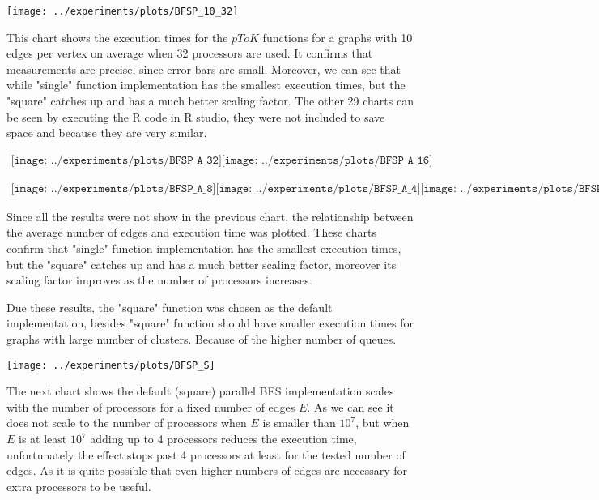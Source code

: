 \documentclass{report}
\theoremstyle{plain}
\theoremstyle{definition}
\theoremstyle{remark}
\begin{document}
\texttt{[image: ../experiments/plots/BFSP\_10\_32]}

This chart shows the execution times for the $pToK$ functions for a graphs with 10 edges per vertex on average when 32 processors are used. It confirms that measurements are precise, since error bars are small. Moreover, we can see that while "single" function implementation has the smallest execution times, but the "square" catches up and has a much better scaling factor. The other 29 charts can be seen by executing the R code in R studio, they were not included to save space and because they are very similar. 

\begin{center}
$
\begin{array}{cc}
\texttt{[image: ../experiments/plots/BFSP\_A\_32]}
\texttt{[image: ../experiments/plots/BFSP\_A\_16]}
\end{array}
$

\center
$
\begin{array}{cc}
\texttt{[image: ../experiments/plots/BFSP\_A\_8]}
\texttt{[image: ../experiments/plots/BFSP\_A\_4]}
\texttt{[image: ../experiments/plots/BFSP\_A\_2]}
\end{array}
$
\end{center}

Since all the results were not show in the previous chart, the relationship between the average number of edges and execution time was plotted. These charts confirm that "single" function implementation has the smallest execution times, but the "square" catches up and has a much better scaling factor, moreover its scaling factor improves as the number of processors increases.

Due these results, the "square" function was chosen as the default implementation, besides "square" function should have smaller execution times for graphs with large number of clusters. Because of the higher number of queues.

\texttt{[image: ../experiments/plots/BFSP\_S]}

The next chart shows the default (square) parallel BFS implementation scales with the number of processors for a fixed number of edges $E$. As we can see it does not  scale to the number of processors when $E$ is smaller than $10^7$, but when $E$ is at least $10^7$ adding up to 4 processors reduces the execution time, unfortunately the effect stops past 4 processors at least for the tested number of edges. As it is quite possible that even higher numbers of edges are necessary for extra processors to be useful.
\end{document}

